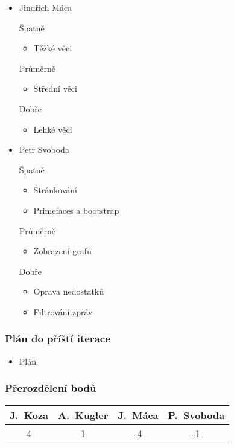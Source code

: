 \documentclass{beamer}
\begin{document}
\begin{frame}[allowframebreaks]
\begin{itemize}
    \item Jindřich Máca
      \begin{block}{Špatně} %
       \begin{itemize}
        \item Těžké věci
       \end{itemize}
     \end{block}
     \begin{block}{Průměrně} %
        \begin{itemize}
        \item Střední věci
       \end{itemize}
     \end{block}
     \begin{block}{Dobře} %
       \begin{itemize}
        \item Lehké věci
       \end{itemize}
     \end{block}
   
    \item Petr Svoboda
     \begin{block}{Špatně} %
       \begin{itemize}
        \item Stránkování
        \item Primefaces a bootstrap
       \end{itemize}
     \end{block}
     \begin{block}{Průměrně} %
       \begin{itemize}
        \item Zobrazení grafu
       \end{itemize}
     \end{block}
     \begin{block}{Dobře} %
       \begin{itemize}
        \item Oprava nedostatků
        \item Filtrování zpráv
       \end{itemize}
     \end{block}
   \end{itemize}
\end{frame}

\begin{frame}[allowframebreaks]\frametitle{Plán do příští iterace}
  \begin{itemize}
    \item Plán
  \end{itemize}
\end{frame}

\begin{frame}[allowframebreaks]\frametitle{Přerozdělení bodů}
    
    \begin{center}
  \begin{tabular}{| c | c | c | c |}
    \hline
     J.~Koza & A.~Kugler & J.~Máca & P.~Svoboda \\
    \hline
     4 & 1 & -4 & -1 \\
    \hline
  \end{tabular}     
   \end{center}
\end{frame}
\end{document}
